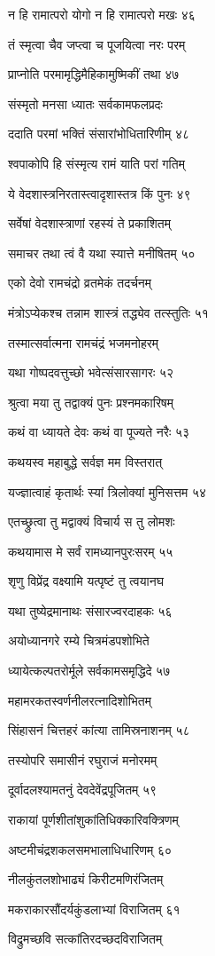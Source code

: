 न हि रामात्परो योगो न हि रामात्परो मखः ४६

तं स्मृत्वा चैव जप्त्वा च पूजयित्वा नरः परम्

प्राप्नोति परमामृद्धिमैहिकामुष्मिकीं तथा ४७

संस्मृतो मनसा ध्यातः सर्वकामफलप्रदः

ददाति परमां भक्तिं संसारांभोधितारिणीम् ४८

श्वपाकोपि हि संस्मृत्य रामं याति परां गतिम्

ये वेदशास्त्रनिरतास्त्वादृशास्तत्र किं पुनः ४९

सर्वेषां वेदशास्त्राणां रहस्यं ते प्रकाशितम्

समाचर तथा त्वं वै यथा स्यात्ते मनीषितम् ५०

एको देवो रामचंद्रो व्रतमेकं तदर्चनम्

मंत्रोऽप्येकश्च तन्नाम शास्त्रं तद्ध्येव तत्स्तुतिः ५१

तस्मात्सर्वात्मना रामचंद्रं भजमनोहरम्

यथा गोष्पदवत्तुच्छो भवेत्संसारसागरः ५२

श्रुत्वा मया तु तद्वाक्यं पुनः प्रश्नमकारिषम्

कथं वा ध्यायते देवः कथं वा पूज्यते नरैः ५३

कथयस्व महाबुद्धे सर्वज्ञ मम विस्तरात्

यज्ज्ञात्वाहं कृतार्थः स्यां त्रिलोक्यां मुनिसत्तम ५४

एतच्छ्रुत्वा तु मद्वाक्यं विचार्य स तु लोमशः

कथयामास मे सर्वं रामध्यानपुरःसरम् ५५

शृणु विप्रेंद्र वक्ष्यामि यत्पृष्टं तु त्वयानघ

यथा तुष्येद्रमानाथः संसारज्वरदाहकः ५६

अयोध्यानगरे रम्ये चित्रमंडपशोभिते

ध्यायेत्कल्पतरोर्मूले सर्वकामसमृद्धिदे ५७

महामरकतस्वर्णनीलरत्नादिशोभितम्

सिंहासनं चित्तहरं कांत्या तामिस्रनाशनम् ५८

तस्योपरि समासीनं रघुराजं मनोरमम्

दूर्वादलश्यामतनुं देवदेवेंद्रपूजितम् ५९

राकायां पूर्णशीतांशुकांतिधिक्कारिवक्त्रिणम्

अष्टमीचंद्रशकलसमभालाधिधारिणम् ६०

नीलकुंतलशोभाढ्यं किरीटमणिरंजितम्

मकराकारसौंदर्यकुंडलाभ्यां विराजितम् ६१

विद्रुमच्छवि सत्कांतिरदच्छदविराजितम्

